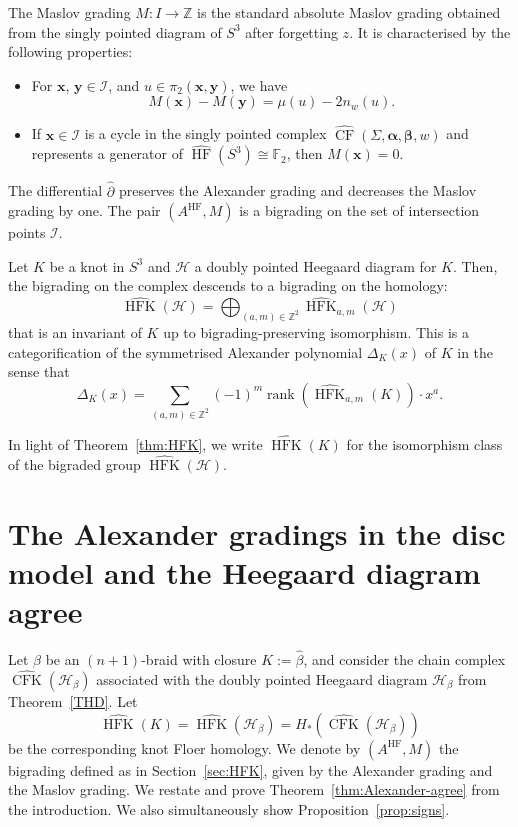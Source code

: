 \documentclass[11pt]{amsart}
\numberwithin{equation}{section}
\numberwithin{figure}{section}
\theoremstyle{definition}
\newcommand{\cH}{\mathcal{H}}
\newcommand{\cI}{\mathcal{I}}
\newcommand{\bF}{\mathbb{F}}
\newcommand{\bZ}{\mathbb{Z}}
\newcommand{\ph}{\widehat{\partial}}
\DeclareMathOperator{\rank}{rank}
\DeclareMathOperator{\CFK}{CFK}
\newcommand{\CFKh}{\widehat{\CFK}}
\DeclareMathOperator{\CF}{CF}
\newcommand{\CFh}{\widehat{\CF}}
\DeclareMathOperator{\HF}{HF}
\newcommand{\HFh}{\widehat{\HF}}
\DeclareMathOperator{\HFK}{HFK}
\newcommand{\HFKh}{\widehat{\HFK}}
\newcommand{\as}{\boldsymbol{\alpha}}
\newcommand{\bs}{\boldsymbol{\beta}}
\newcommand{\xs}{\boldsymbol{x}}
\newcommand{\ys}{\boldsymbol{y}}
\begin{document}
The Maslov grading $M \colon I \rightarrow \mathbb Z$ is the standard absolute Maslov grading obtained from the singly pointed diagram of $S^3$ after forgetting $z$. It is characterised by the following properties:
\begin{itemize}
\item For $\xs$, $\ys \in \cI$, and $u \in \pi_2(\xs,\ys)$, we have 
\[
M(\xs)-M(\ys)=\mu(u)-2 n_{w}(u).
\]
\item If $\xs \in \cI$ is a cycle in the singly pointed complex $\CFh(\Sigma,\as,\bs,w)$ and represents a generator of $\HFh(S^3) \cong \bF_2$, then $M(\xs) = 0$. 
\end{itemize}
The differential $\ph$ preserves the Alexander grading and decreases the Maslov grading by one. The pair $(A^{\HF}, M)$ is a bigrading on the set of intersection points $\cI$. 

\begin{thm}\label{thm:HFK}
Let $K$ be a knot in $S^3$ and $\mathcal H$ a doubly pointed Heegaard diagram for $K$. Then, the bigrading on the complex descends to a bigrading on the homology:
\[
\HFKh(\mathcal H) = \bigoplus_{(a, m) \in \bZ^2} \HFKh_{a, m}(\mathcal H)
\]
that is an invariant of $K$ up to bigrading-preserving isomorphism.
This is a categorification of the symmetrised Alexander polynomial $\Delta_K(x)$ of $K$ in the sense that
\begin{equation}
\Delta_K(x) = \sum_{(a, m) \in \bZ^2} (-1)^{m} \rank \left( \HFKh_{a, m}(K)\right) \cdot x^{a}.
\end{equation}
\end{thm}

In light of Theorem~\ref{thm:HFK}, we write $\HFKh(K)$ for the isomorphism class of the bigraded group $\HFKh(\mathcal H)$.

\section{The Alexander gradings in the disc model and the Heegaard diagram agree}\label{S:identif}

Let $\beta$ be an $(n+1)$-braid with closure $K := \hat{\beta}$, and consider the chain complex $\CFKh(\mathscr H_{\beta})$ associated with the doubly pointed Heegaard diagram $\mathscr H_{\beta}$ from Theorem~\ref{THD}. Let 
\[
\HFKh(K) = \HFKh(\mathscr H_{\beta}) = H_*\left(\CFKh(\cH_\beta)\right)
\]
be the corresponding knot Floer homology. We denote by $(A^{\HF},M)$ the bigrading defined as in Section~\ref{sec:HFK}, given by the Alexander grading and the Maslov grading. We restate and prove Theorem~\ref{thm:Alexander-agree} from the introduction. We also simultaneously show Proposition~\ref{prop:signs}.
\end{document}
